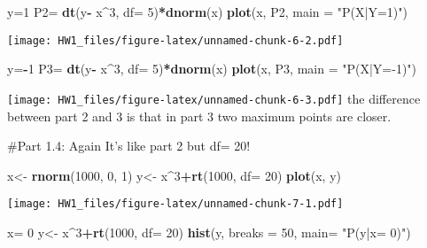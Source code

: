 \documentclass[]{article}
\newenvironment{Shaded}{\begin{snugshade}}{\end{snugshade}}
\newcommand{\DataTypeTok}[1]{\textcolor[rgb]{0.13,0.29,0.53}{#1}}
\newcommand{\DecValTok}[1]{\textcolor[rgb]{0.00,0.00,0.81}{#1}}
\newcommand{\KeywordTok}[1]{\textcolor[rgb]{0.13,0.29,0.53}{\textbf{#1}}}
\newcommand{\NormalTok}[1]{#1}
\newcommand{\OperatorTok}[1]{\textcolor[rgb]{0.81,0.36,0.00}{\textbf{#1}}}
\newcommand{\StringTok}[1]{\textcolor[rgb]{0.31,0.60,0.02}{#1}}
\begin{document}
\begin{Shaded}
\begin{Highlighting}[]
\NormalTok{y=}\DecValTok{1}
\NormalTok{P2=}\StringTok{ }\KeywordTok{dt}\NormalTok{(y}\OperatorTok{-}\StringTok{ }\NormalTok{x}\OperatorTok{^}\DecValTok{3}\NormalTok{, }\DataTypeTok{df=} \DecValTok{5}\NormalTok{)}\OperatorTok{*}\KeywordTok{dnorm}\NormalTok{(x)}
\KeywordTok{plot}\NormalTok{(x, P2, }\DataTypeTok{main =} \StringTok{"P(X|Y=1)"}\NormalTok{)}
\end{Highlighting}
\end{Shaded}

\texttt{[image: HW1\_files/figure-latex/unnamed-chunk-6-2.pdf]}

\begin{Shaded}
\begin{Highlighting}[]
\NormalTok{y=}\OperatorTok{-}\DecValTok{1}
\NormalTok{P3=}\StringTok{ }\KeywordTok{dt}\NormalTok{(y}\OperatorTok{-}\StringTok{ }\NormalTok{x}\OperatorTok{^}\DecValTok{3}\NormalTok{, }\DataTypeTok{df=} \DecValTok{5}\NormalTok{)}\OperatorTok{*}\KeywordTok{dnorm}\NormalTok{(x)}
\KeywordTok{plot}\NormalTok{(x, P3, }\DataTypeTok{main =} \StringTok{"P(X|Y=-1)"}\NormalTok{)}
\end{Highlighting}
\end{Shaded}

\texttt{[image: HW1\_files/figure-latex/unnamed-chunk-6-3.pdf]} the
difference between part 2 and 3 is that in part 3 two maximum points are
closer.

\#Part 1.4: Again It's like part 2 but df= 20!

\begin{Shaded}
\begin{Highlighting}[]
\NormalTok{x<-}\StringTok{ }\KeywordTok{rnorm}\NormalTok{(}\DecValTok{1000}\NormalTok{, }\DecValTok{0}\NormalTok{, }\DecValTok{1}\NormalTok{)}
\NormalTok{y<-}\StringTok{ }\NormalTok{x}\OperatorTok{^}\DecValTok{3}\OperatorTok{+}\KeywordTok{rt}\NormalTok{(}\DecValTok{1000}\NormalTok{, }\DataTypeTok{df=} \DecValTok{20}\NormalTok{)}
\KeywordTok{plot}\NormalTok{(x, y)}
\end{Highlighting}
\end{Shaded}

\texttt{[image: HW1\_files/figure-latex/unnamed-chunk-7-1.pdf]}

\begin{Shaded}
\begin{Highlighting}[]
\NormalTok{x=}\StringTok{ }\DecValTok{0}
\NormalTok{y<-}\StringTok{ }\NormalTok{x}\OperatorTok{^}\DecValTok{3}\OperatorTok{+}\KeywordTok{rt}\NormalTok{(}\DecValTok{1000}\NormalTok{, }\DataTypeTok{df=} \DecValTok{20}\NormalTok{)}
\KeywordTok{hist}\NormalTok{(y, }\DataTypeTok{breaks =}  \DecValTok{50}\NormalTok{, }\DataTypeTok{main=} \StringTok{"P(y|x= 0)"}\NormalTok{)}
\end{Highlighting}
\end{Shaded}
\end{document}
